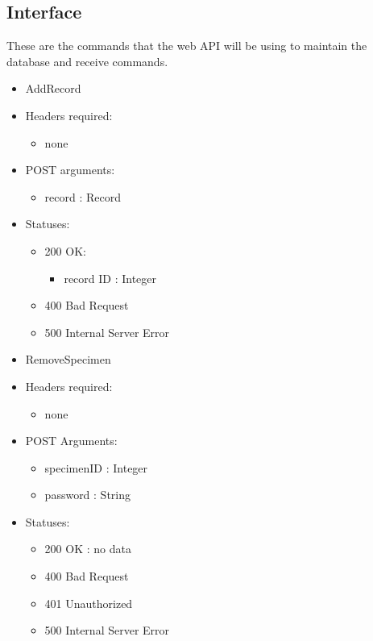 \subsection{Interface}
    These are the commands that the web API will be using to maintain the database and receive commands.
    \begin{itemize}
        \item AddRecord
        \item Headers required:
        \begin{itemize}
            \item none
        \end{itemize}
        \item POST arguments:
        \begin{itemize}
            \item record : Record
        \end{itemize}
        \item Statuses:
        \begin{itemize}
        	\item 200 OK:
            \begin{itemize}
        		\item record ID : Integer
            \end{itemize}
        	\item 400 Bad Request
        	\item 500 Internal Server Error
        \end{itemize}

        \item RemoveSpecimen
        \item Headers required: 
        \begin{itemize}
        	\item none
        \end{itemize}
        \item POST Arguments:
        \begin{itemize}
        	\item specimenID : Integer
        	\item password : String
        \end{itemize}
        \item Statuses:
        \begin{itemize}
        	\item 200 OK : no data
        	\item 400 Bad Request
        	\item 401 Unauthorized
        	\item 500 Internal Server Error
        \end{itemize}


\end{itemize}
